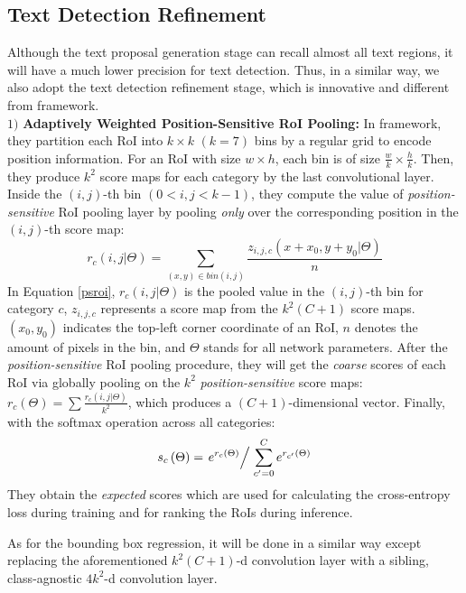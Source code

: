 \documentclass[letterpaper]{article}
\begin{document}
\subsection{Text Detection Refinement}
Although the text proposal generation stage can recall almost all text regions, it will have a much lower precision for text detection. Thus, in a similar way, we also adopt the text detection refinement stage, which is innovative and different from \cite{dai2016r} framework.\\
$1)$ \textbf{Adaptively Weighted Position-Sensitive RoI Pooling:} In \cite{dai2016r} framework, they partition each RoI into $k \times k$ $\left(k=7\right)$ bins by a regular grid to encode position information. For an RoI with size $w \times h$, each bin is of size $\frac{w}{k} \times \frac{h}{k}$. Then, they produce $k^2$ score maps for each category by the last convolutional layer. Inside the $\left(i, j\right)$-th bin $(0 < i, j < k-1)$, they compute the value of \textit{position-sensitive} RoI pooling layer by pooling \textit{only} over the corresponding position in the $(i, j)$-th score map:
\begin{equation}\label{psroi}
r_c\left(i,j|\Theta\right)=\sum\limits_{\left(x,y\right)\in bin\left(i,j\right)}{\frac{z_{i,j,c}\left(x + x_0, y + y_0|\Theta\right)}{n}}
\end{equation}
In Equation \ref{psroi}, $r_c\left(i,j|\Theta\right)$ is the pooled value in the $(i,j)$-th bin for category $c$, $z_{i,j,c}$ represents a score map from the $k^2(C + 1)$ score maps. $(x_0, y_0)$ indicates the top-left corner coordinate of an RoI, $n$ denotes the amount of pixels in the bin, and $\Theta$ stands for all network parameters. After the \textit{position-sensitive} RoI pooling procedure, they will get the \textit{coarse} scores of each RoI via globally pooling on the $k^2$ \textit{position-sensitive} score maps: $r_c\left(\Theta\right)=\sum{\frac{r_c\left(i,j|\Theta\right)}{k^2}}$, which produces a $(C + 1)$-dimensional vector. 
Finally, with the softmax operation across all categories:
\begin{equation}\label{soft}
s_c\left(\Theta\right)=\left.{e^{r_c\left(\Theta\right)}}\middle/\right. {\sum\limits_{c'=0}^C{e^{r_{c'}\left(\Theta\right)}}}
\end{equation}
They obtain the \textit{expected} scores which are used for calculating the cross-entropy loss during training and for ranking the RoIs during inference.

As for the bounding box regression, it will be done in a similar way except replacing the aforementioned $k^2(C+1)$-d
convolution layer with a sibling, class-agnostic $4k^2$-d convolution layer.
\end{document}
